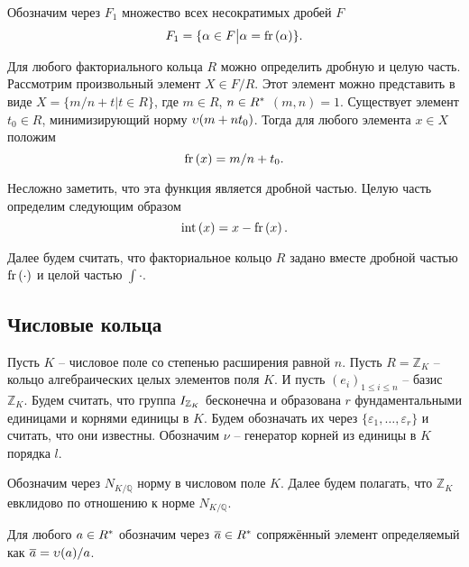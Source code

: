 \documentclass[_00_dissertation.tex]{subfiles}
\begin{document}
\begin{definition}
    Обозначим через $F_1$ множество всех несократимых дробей $F$
    \begin{equation*}
        F_1 = \{
            \alpha \in F \big| \alpha = \textrm{fr}\left(\alpha\right)
        \}.
    \end{equation*}
\end{definition}

\begin{remark}\label{remark:easy_fr}
    Для любого факториального кольца $R$ можно определить дробную и целую часть.
    Рассмотрим произвольный элемент $X \in F/R$.
    Этот элемент можно представить в виде $X = \{m/n + t | t \in R\}$, где $m \in R$, $n \in R^{*}$ $(m, n) = 1$.
    Существует элемент $t_0 \in R$, минимизирующий норму $\upsilon(m + n t_0)$.
    Тогда для любого элемента $x \in X$ положим
    \begin{equation*}
        \textrm{fr}\left(x\right) = m/n + t_0.
    \end{equation*}

    Несложно заметить, что эта функция является дробной частью.
    Целую часть определим следующим образом
    \begin{equation*}
        \textrm{int}\left(x\right) = x - \textrm{fr}\left(x\right).
    \end{equation*}
\end{remark}

Далее будем считать, что факториальное кольцо $R$ задано вместе дробной частью $\textrm{fr}\left(\cdot\right)$ и целой частью $\int{\cdot}$.

\subsection{Числовые кольца}

Пусть $K$ -- числовое поле со степенью расширения равной $n$.
Пусть $R = \mathbb{Z}_K$ -- кольцо алгебраических целых элементов поля $K$.
И пусть $(e_i)_{1 \le i \le n}$ -- базис $\mathbb{Z}_K$.
Будем считать, что группа $I_{\mathbb{Z}_K}$ бесконечна и образована $r$ фундаментальными единицами и корнями единицы в $K$.
Будем обозначать их через $\{\varepsilon_1, \dots, \varepsilon_r\}$ и считать, что они известны.
Обозначим $\nu$ -- генератор корней из единицы в $K$ порядка $l$.

Обозначим через $N_{K/\mathbb{Q}}$ норму в числовом поле $K$.
Далее будем полагать, что $\mathbb{Z}_K$ евклидово по отношению к норме $N_{K/\mathbb{Q}}$.

\begin{definition}
    Для любого $a \in R^{*}$ обозначим через $\overline{a} \in R^{*}$ сопряжённый элемент определяемый как $\overline{a} = \upsilon(a)/a$.
\end{definition}
\end{document}
